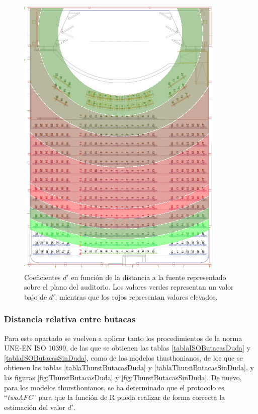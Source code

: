 \documentclass[11pt,a4paper,twoside]{book}
\begin{document}
            \begin{figure}
                \includegraphics[scale=0.9]{../imagenes/auditoriodprime.png}
			    \centering
			    \caption{Coeficientes $d'$ en función de la distancia a la fuente representado sobre el plano del auditorio. Los valores verdes representan un valor bajo de $d'$; mientras que los rojos representan valores elevados.} 
			    \label{fig:dprimeauditorio}
            \end{figure}
        
        \subsubsection*{Distancia relativa entre butacas}
            Para este apartado se vuelven a aplicar tanto los procedimientos de la norma UNE-EN ISO 10399, de las que se obtienen las tablas \ref{tablaISOButacasDuda} y \ref{tablaISOButacasSinDuda}, como de los modelos thusthonianos, de los que se obtienen las tablas \ref{tablaThurstButacasDuda} y \ref{tablaThurstButacasSinDuda}, y las figuras \ref{fig:ThurstButacasDuda} y \ref{fig:ThurstButacasSinDuda}. De nuevo, para los modelos thursthonianos, se ha determinado que el protocolo es ``\textit{twoAFC}'' para que la función de R pueda realizar de forma correcta la estimación del valor $d'$.\newline
            
\end{document}

